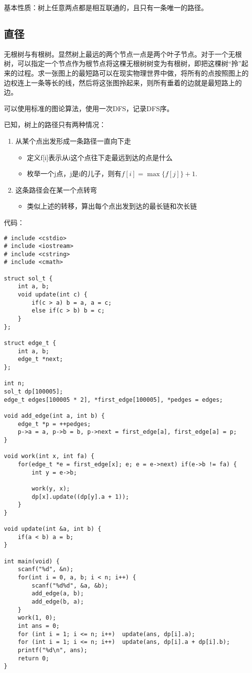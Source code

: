 \documentclass{article}
\begin{document}
基本性质：树上任意两点都是相互联通的，且只有一条唯一的路径。
\subsection{直径}
无根树与有根树。显然树上最远的两个节点一点是两个叶子节点。对于一个无根树，可以指定一个节点作为根节点将这棵无根树树变为有根树，即把这棵树“拎”起来的过程。求一张图上的最短路可以在现实物理世界中做，将所有的点按照图上的边权连上一条等长的线，然后将这张图拎起来，则所有垂着的边就是最短路上的边。

可以使用标准的图论算法，使用一次DFS，记录DFS序。

已知，树上的路径只有两种情况：
\begin{enumerate}
    \item{从某个点出发形成一条路径一直向下走}
    \begin{itemize}
        \item{定义f[i]表示从i这个点往下走最远到达的点是什么}
        \item{枚举一个j点，j是i的儿子，则有$f[i]=\max\{f[j]\}+1$}.
    \end{itemize}
    \item{这条路径会在某一个点转弯}
    \begin{itemize}
        \item{类似上述的转移，算出每个点出发到达的最长链和次长链}
    \end{itemize}
\end{enumerate}
代码：
\begin{verbatim}
# include <cstdio>
# include <iostream>
# include <cstring>
# include <cmath>

struct sol_t {
    int a, b;
    void update(int c) {
        if(c > a) b = a, a = c;
        else if(c > b) b = c;
    }
};

struct edge_t {
    int a, b;
    edge_t *next;
};

int n;
sol_t dp[100005];
edge_t edges[100005 * 2], *first_edge[100005], *pedges = edges;

void add_edge(int a, int b) {
    edge_t *p = ++pedges;
    p->a = a, p->b = b, p->next = first_edge[a], first_edge[a] = p;
}

void work(int x, int fa) {
    for(edge_t *e = first_edge[x]; e; e = e->next) if(e->b != fa) {
        int y = e->b;

        work(y, x);
        dp[x].update((dp[y].a + 1));
    }
}

void update(int &a, int b) {
    if(a < b) a = b;
}

int main(void) {
    scanf("%d", &n);
    for(int i = 0, a, b; i < n; i++) {
        scanf("%d%d", &a, &b);
        add_edge(a, b);
        add_edge(b, a);
    }
    work(1, 0);
    int ans = 0;
    for (int i = 1; i <= n; i++)  update(ans, dp[i].a);
    for (int i = 1; i <= n; i++)  update(ans, dp[i].a + dp[i].b);
    printf("%d\n", ans);
    return 0;
}
\end{verbatim}
\end{document}
